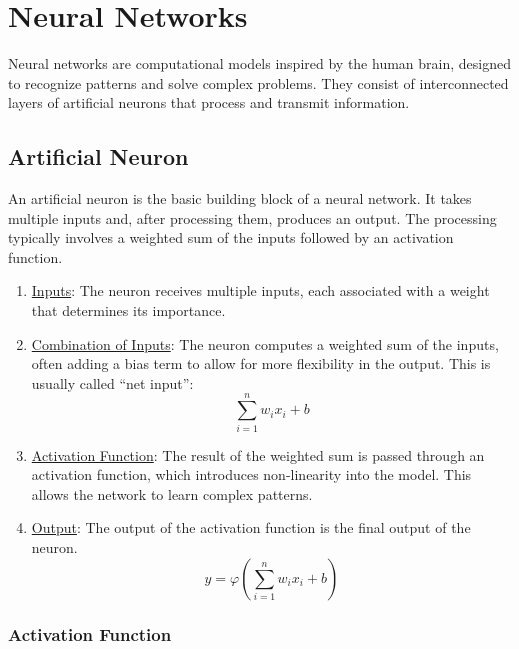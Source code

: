 \chapter{Neural Networks}

Neural networks are computational models inspired by the human brain, designed to recognize patterns and solve complex problems. They consist of interconnected layers of artificial neurons that process and transmit information.

\section{Artificial Neuron}

An artificial neuron is the basic building block of a neural network. It takes multiple inputs and, after processing them, produces an output. The processing typically involves a weighted sum of the inputs followed by an activation function.
\begin{enumerate}
    \item \ul{Inputs}: The neuron receives multiple inputs, each associated with a weight that determines its importance.
    \item \ul{Combination of Inputs}: The neuron computes a weighted sum of the inputs, often adding a bias term to allow for more flexibility in the output. This is usually called ``net input'':
    \begin{equation*}
        \sum_{i=1}^{n} w_i x_i + b
    \end{equation*}
    \item \ul{Activation Function}: The result of the weighted sum is passed through an activation function, which introduces non-linearity into the model. This allows the network to learn complex patterns.
    \item \ul{Output}: The output of the activation function is the final output of the neuron.
    \begin{equation*}
        y = \varphi\left(\sum_{i=1}^{n} w_i x_i + b\right)
    \end{equation*}
\end{enumerate}

\subsection{Activation Function}

